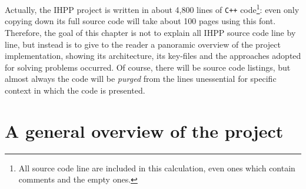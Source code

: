 \documentclass[a4paper,11pt]{report}
\begin{document}
Actually, the IHPP project is written in about 4,800 lines of \verb|C++| 
code\footnote{All source code line are included in this calculation, even ones which 
contain comments and the empty ones.}: 
even only copying down its full source code will take about 100 pages using
this font. Therefore, the goal of this chapter is not to explain 
all IHPP source code line by line, but instead is to give to the reader 
a panoramic overview of the project implementation, showing its architecture, 
its key-files and the approaches adopted for solving problems occurred.
Of course, there will be source code listings, but almost always the code will be
\emph{purged} from the lines unessential for specific context in which the code is presented.

\section{A general overview of the project}
\end{document}
